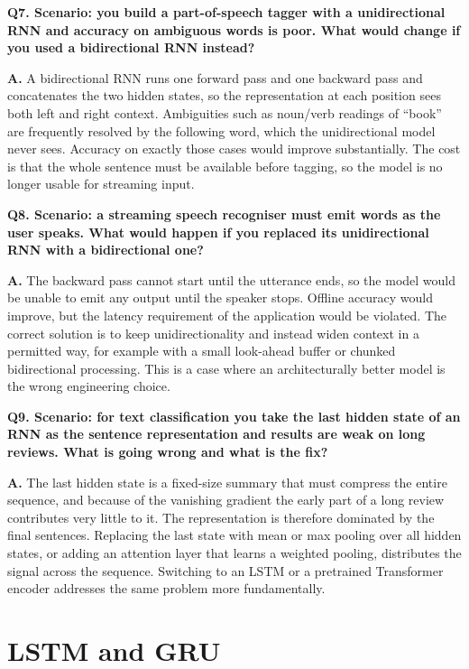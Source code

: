 \documentclass[11pt]{article}
\begin{document}
\medskip
\noindent\textbf{Q7. Scenario: you build a part-of-speech tagger with a unidirectional RNN and accuracy on ambiguous words is poor. What would change if you used a bidirectional RNN instead?}

\noindent\textbf{A.} A bidirectional RNN runs one forward pass and one backward pass and concatenates the two hidden states, so the representation at each position sees both left and right context. Ambiguities such as noun/verb readings of ``book'' are frequently resolved by the following word, which the unidirectional model never sees. Accuracy on exactly those cases would improve substantially. The cost is that the whole sentence must be available before tagging, so the model is no longer usable for streaming input.

\medskip
\noindent\textbf{Q8. Scenario: a streaming speech recogniser must emit words as the user speaks. What would happen if you replaced its unidirectional RNN with a bidirectional one?}

\noindent\textbf{A.} The backward pass cannot start until the utterance ends, so the model would be unable to emit any output until the speaker stops. Offline accuracy would improve, but the latency requirement of the application would be violated. The correct solution is to keep unidirectionality and instead widen context in a permitted way, for example with a small look-ahead buffer or chunked bidirectional processing. This is a case where an architecturally better model is the wrong engineering choice.

\medskip
\noindent\textbf{Q9. Scenario: for text classification you take the last hidden state of an RNN as the sentence representation and results are weak on long reviews. What is going wrong and what is the fix?}

\noindent\textbf{A.} The last hidden state is a fixed-size summary that must compress the entire sequence, and because of the vanishing gradient the early part of a long review contributes very little to it. The representation is therefore dominated by the final sentences. Replacing the last state with mean or max pooling over all hidden states, or adding an attention layer that learns a weighted pooling, distributes the signal across the sequence. Switching to an LSTM or a pretrained Transformer encoder addresses the same problem more fundamentally.

\section{LSTM and GRU}
\end{document}
